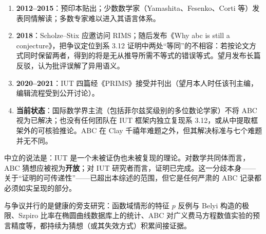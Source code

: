 \begin{enumerate}[label=(\arabic*)]
    \item \textbf{2012--2015}：预印本贴出；少数数学家（Yamashita、Fesenko\cite{fesenko2015}、Corti 等）发表同情解读；多数专家难以进入其语言体系。
    \item \textbf{2018}：Scholze--Stix 应邀访问 RIMS；随后发布《Why abc is still a conjecture》\cite{scholzestix2018}，把争议定位到系 3.12 证明中两处“等同”的不相容：若按论文方式同时保留两者，得到的将是无从推导所需不等式的错误等式。望月发布长篇反驳，认为批评误解了异用语义。
    \item \textbf{2020--2021}：IUT 四篇经《PRIMS》接受并刊出（望月本人时任该刊主编，编辑流程受到公开讨论）。
    \item \textbf{当前状态}：国际数学界主流（包括菲尔兹奖级别的多位数论学家）不将 ABC 视为已解决；也没有任何团队在 IUT 框架内独立复现系 3.12，或从中提取框架外的可核验推论。ABC 在 Clay 千禧年难题之外，但其解决标准与七个难题并无不同。
\end{enumerate}

\begin{remark}
    中立的说法是：IUT 是一个未被证伪也未被复现的理论。对数学共同体而言，ABC 猜想应被视为\textbf{开放}；对 IUT 研究者而言，证明已完成。这一分歧本身——关于“证明的可传递性”——已超出本综述的范围，但它是任何严肃的 ABC 记录都必须如实呈现的部分。
\end{remark}

\begin{remark}
    与争议并行的是健康的旁支研究：函数域情形的特征 $p$ 反例与 Belyi 构造的极限、Szpiro 比率在椭圆曲线数据库上的统计、ABC 对广义费马方程数值实验的预言精度等，都持续为猜想（或其失效方式）积累间接证据。
\end{remark}
